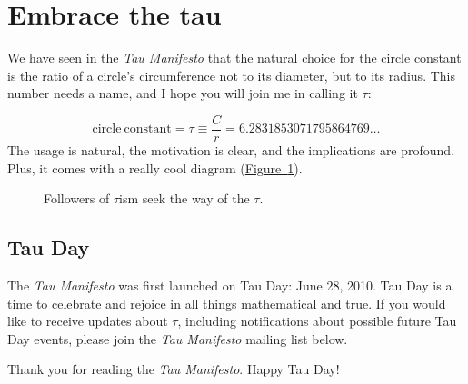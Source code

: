 \documentclass{article}
\begin{document}

\section{Embrace the tau}
\label{sec:embrace_the_tau}

We have seen in the \emph{Tau Manifesto} that the natural choice for the circle constant is the ratio of a circle's circumference not to its diameter, but to its radius. This number needs a name, and I hope you will join me in calling it $\tau$:

\[
  \mathrm{circle\ constant} = \tau \equiv \frac{C}{r} = 6.2831853071795864769\ldots
\]
The usage is natural, the motivation is clear, and the implications are profound. Plus, it comes with a really cool diagram (\hyperref[fig:tauism]{Figure~}\ref{fig:tauism}).

\begin{figure}
\begin{center}
\end{center}
\caption{Followers of $\tau$ism seek the way of the $\tau$.\label{fig:tauism}}
\end{figure}

  \subsection{Tau Day} %
  \label{sec:tau_day}
  

The \emph{Tau Manifesto} was first launched on Tau Day: June 28, 2010. Tau Day is a time to celebrate and rejoice in all things mathematical and true. If you would like to receive updates about $\tau$, including notifications about possible future Tau Day events, please join the \emph{Tau Manifesto} mailing list below.

Thank you for reading the \emph{Tau Manifesto}. Happy Tau Day!






\end{document}
